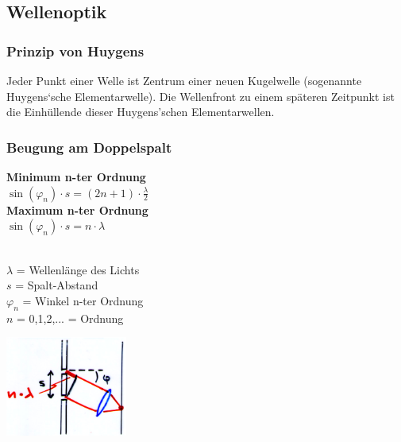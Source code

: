 \subsection{Wellenoptik}

\subsubsection{Prinzip von Huygens }
Jeder Punkt einer Welle ist Zentrum einer neuen Kugelwelle  
(sogenannte Huygens‘sche Elementarwelle). 
Die Wellenfront zu einem späteren Zeitpunkt ist die Einhüllende dieser Huygens'schen Elementarwellen.\\

\begin{minipage}{9.5cm}
	\subsubsection{Beugung am Doppelspalt}
	\begin{minipage}{4.5cm}
	\textbf{Minimum n-ter Ordnung}\\
		$\sin(\varphi_n) \cdot s = (2n + 1)\cdot \frac{\lambda}{2} $\\
	\textbf{Maximum n-ter Ordnung}\\
			$\sin(\varphi_n) \cdot s = n \cdot \lambda $\\ 
			\\
		\begin{minipage}{4.5cm}
			$\lambda$ = Wellenlänge des Lichts\\
			$s$ = Spalt-Abstand\\
			$\varphi_n$ = Winkel n-ter Ordnung\\
			$n$ = 0,1,2,... = Ordnung
		\end{minipage}
	\end{minipage}
	\begin{minipage}{4cm}
		\includegraphics[width = 4cm]{./bilder/beugung-doppelspalt}
	\end{minipage}
\end{minipage}
